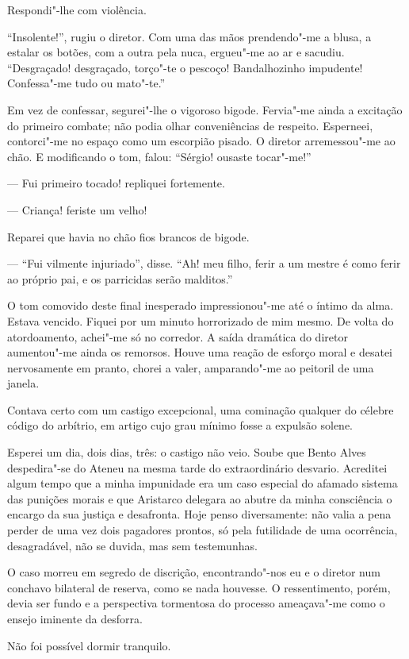 Respondi"-lhe com violência. 

``Insolente!'', rugiu o diretor. Com uma das
mãos prendendo"-me a blusa, a estalar os botões, com a outra pela
nuca, ergueu"-me ao ar e sacudiu. ``Desgraçado! desgraçado, torço"-te
o pescoço! Bandalhozinho impudente! Confessa"-me tudo ou mato"-te.''

Em vez de confessar, segurei"-lhe o vigoroso bigode. Fervia"-me ainda
a excitação do primeiro combate; não podia olhar conveniências de
respeito. Esperneei, contorci"-me no espaço como um escorpião pisado.
O diretor arremessou"-me ao chão. E modificando o tom, falou: ``Sérgio!
ousaste tocar"-me!'' 

--- Fui primeiro tocado! repliquei fortemente. 

--- Criança! feriste um velho! 

Reparei que havia no chão fios brancos de bigode. 

--- ``Fui vilmente injuriado'', disse. ``Ah! meu filho, ferir a
um mestre é como ferir ao próprio pai, e os parricidas serão malditos.''

O tom comovido deste final inesperado impressionou"-me até o íntimo da
alma. Estava vencido. Fiquei por um minuto horrorizado de mim mesmo. De
volta do atordoamento, achei"-me só no corredor. A saída dramática do
diretor aumentou"-me ainda os remorsos. Houve uma reação de esforço
moral e desatei nervosamente em pranto, chorei a valer, amparando"-me
ao peitoril de uma janela. 

Contava certo com um castigo excepcional,
uma cominação qualquer do célebre código do arbítrio, em artigo cujo
grau mínimo fosse a expulsão solene. 

Esperei um dia, dois dias, três: o
castigo não veio. Soube que Bento Alves despedira"-se do Ateneu na
mesma tarde do extraordinário desvario. Acreditei algum tempo que a
minha impunidade era um caso especial do afamado sistema das punições
morais e que Aristarco delegara ao abutre da minha consciência o
encargo da sua justiça e desafronta. Hoje penso diversamente: não valia
a pena perder de uma vez dois pagadores prontos, só pela futilidade de
uma ocorrência, desagradável, não se duvida, mas sem testemunhas. 

O caso morreu em segredo de discrição, encontrando"-nos eu e o diretor
num conchavo bilateral de reserva, como se nada houvesse. O
ressentimento, porém, devia ser fundo e a perspectiva tormentosa do
processo ameaçava"-me como o ensejo iminente da desforra.

Não foi possível dormir tranquilo. 

